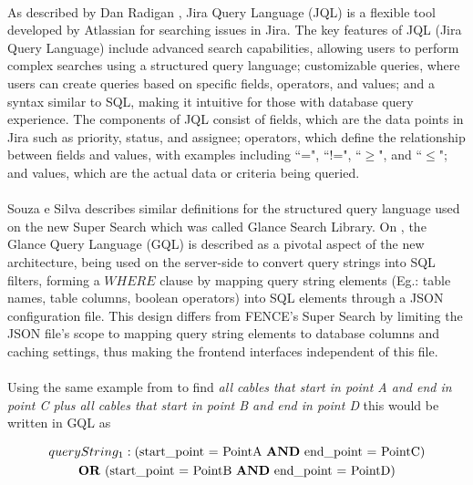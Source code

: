 \paragraph{} As described by Dan Radigan \cite{jirajql}, Jira Query Language (JQL) is a flexible tool developed by Atlassian for searching issues in Jira. The key features of JQL (Jira Query Language) include advanced search capabilities, allowing users to perform complex searches using a structured query language; customizable queries, where users can create queries based on specific fields, operators, and values; and a syntax similar to SQL, making it intuitive for those with database query experience. The components of JQL consist of fields, which are the data points in Jira such as priority, status, and assignee; operators, which define the relationship between fields and values, with examples including ``=", ``!=", ``$\ge$", and ``$\le$"; and values, which are the actual data or criteria being queried. 

\paragraph{} Souza e Silva \cite{SouzaSilva2023Glance} describes similar definitions for the structured query language used on the new Super Search which was called Glance Search Library. On \cite{SouzaSilva2023Glance}, the Glance Query Language (GQL) is described as a pivotal aspect of the new architecture, being used on the server-side to convert query strings into SQL filters, forming a $WHERE$ clause by mapping query string elements (Eg.: table names, table columns, boolean operators) into SQL elements through a JSON configuration file. This design differs from FENCE's Super Search by limiting the JSON file's scope to mapping query string elements to database columns and caching settings, thus making the frontend interfaces independent of this file. 

\paragraph{} Using the same example from \cite{SouzaSilva2023Glance} to find \textit{all cables that start in point A and end in point C plus all cables that start in point B and end in point D} this would be written in GQL as 

\begin{multline*}
queryString_1: \text{(start\_point = PointA \textbf{AND} end\_point = PointC)} \\
\text{\textbf{OR} (start\_point = PointB \textbf{AND} end\_point = PointD)}
\end{multline*}

